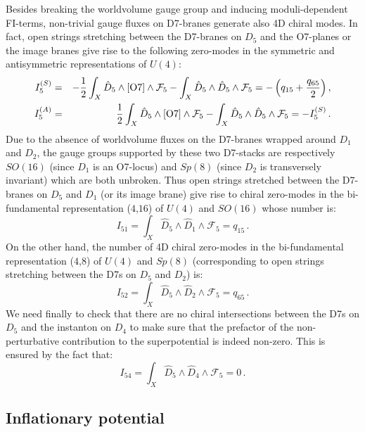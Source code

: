 \documentclass[11pt,a4paper]{article}
\newcommand{\bea}{\begin{eqnarray}}
\newcommand{\eea}{\end{eqnarray}}
\newcommand{\be}{\begin{equation}}
\newcommand{\ee}{\end{equation}}
\newcommand{\F}{\mathcal{F}}
\begin{document}
Besides breaking the worldvolume gauge group and inducing moduli-dependent FI-terms, non-trivial gauge fluxes on D7-branes generate also 4D chiral modes. In fact, open strings stretching between the D7-branes on $D_5$ and the O7-planes or the image branes give rise to the following zero-modes in the symmetric and antisymmetric representations of $U(4)$:
\bea
I_5^{(S)} &=& - \frac12 \int_X \hat{D}_5 \wedge [{\rm O7}] \wedge \F_5 - \int_X \hat{D}_5 \wedge \hat{D}_5 \wedge \F_5 
= -\left(q_{15}+\frac{q_{65}}{2}\right), \\
I_5^{(A)} &=& \frac12 \int_X \hat{D}_5 \wedge [{\rm O7}] \wedge \F_5 - \int_X \hat{D}_5 \wedge \hat{D}_5 \wedge \F_5 = - I_5^{(S)}\,.
\eea
Due to the absence of worldvolume fluxes on the D7-branes wrapped around $D_1$ and $D_2$, the gauge groups supported by these two D7-stacks are respectively $SO(16)$ (since $D_1$ is an O7-locus) and $Sp(8)$ (since $D_2$ is transversely invariant) which are both unbroken. Thus open strings stretched between the D7-branes on $D_5$ and $D_1$ (or its image brane) give rise to chiral zero-modes in the bi-fundamental representation ($4$,$16$) of $U(4)$ and $SO(16)$ whose number is:
\be
I_{51}=\int_X \hat{D}_5 \wedge \hat{D}_1 \wedge \F_5 = q_{15}\,.
\ee
On the other hand, the number of 4D chiral zero-modes in the bi-fundamental representation ($4$,$8$) of $U(4)$ and $Sp(8)$ (corresponding to open strings stretching between the D7s on $D_5$ and $D_2$) is:
\be
I_{52}=\int_X \hat{D}_5 \wedge \hat{D}_2 \wedge \F_5 = q_{65}\,.
\ee
We need finally to check that there are no chiral intersections between the D7s on $D_5$ and the instanton on $D_4$ to make sure that the prefactor of the non-perturbative contribution to the superpotential is indeed non-zero. This is ensured by the fact that:
\be
I_{54}=\int_X \hat{D}_5 \wedge \hat{D}_4 \wedge \F_5 = 0 \,.
\ee

\subsection{Inflationary potential}
\end{document}
